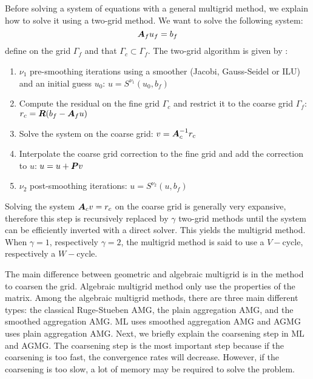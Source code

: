 Before solving a system of equations with a general multigrid method, we
explain how to solve it using a two-grid method. We want to
solve the following system:
\begin{equation}
  \boldsymbol{A}_f u_f = b_f
\end{equation}
define on the grid $\Gamma_f$ and that $\Gamma_c \subset \Gamma_f$. The 
two-grid algorithm is given by :
\begin{enumerate}
  \item $\nu_1$ pre-smoothing iterations using a smoother (Jacobi,
    Gauss-Seidel or ILU) and an initial guess $u_0$: $u = S^{\nu_1}(u_0,b_f)$
  \item Compute the residual on the fine grid $\Gamma_c$ and restrict it to
    the coarse grid $\Gamma_f$: $r_c = \boldsymbol{R}(b_f-\boldsymbol{A}_f u)$
  \item Solve the system on the coarse grid: $v=\boldsymbol{A}_c^{-1} r_c$
  \item Interpolate the coarse grid correction to the fine grid and add the
    correction to $u$: $u=u+\boldsymbol{P}v$
  \item $\nu_2$ post-smoothing iterations: $u = S^{\nu_2}(u,b_f)$
\end{enumerate}
Solving the system $\boldsymbol{A}_c v = r_c$ on the coarse grid is generally very
expansive, therefore this step is recursively replaced by $\gamma$ two-grid
methods until the system can be efficiently inverted with a direct solver.
This yields the multigrid method. When $\gamma = 1$, respectively $\gamma =
2$, the multigrid method is said to use a $V-$cycle, respectively a $W-$cycle.

The main difference between geometric and algebraic multigrid is in the method
to coarsen the grid. Algebraic multigrid method only use the properties of the
matrix. Among the algebraic multigrid methods, there are three main different 
types: the classical Ruge-Stueben AMG, the plain aggregation AMG, and the
smoothed aggregation AMG. ML uses smoothed aggregation AMG and AGMG
uses plain aggregation AMG. Next, we briefly explain the coarsening step in
ML and AGMG. The coarsening step is the most important 
step because if the coarsening is too fast, the convergence rates will 
decrease. However, if the coarsening is too slow, a lot of memory may be 
required to solve the problem. 

